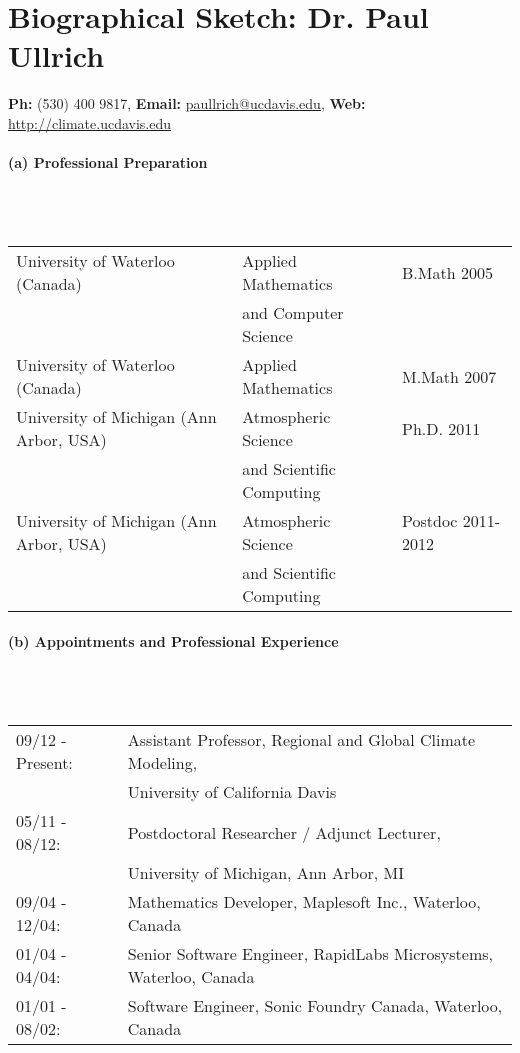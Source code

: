 \documentclass[11pt]{article}
\begin{document}
\thispagestyle{empty}

\appendix

\setcounter{section}{5}

\section*{Biographical Sketch: Dr. Paul Ullrich}

\vspace{-0.5cm}
\begin{center}
\textbf{Ph:} (530) 400 9817, \textbf{Email:} \url{paullrich@ucdavis.edu}, \textbf{Web:} \url{http://climate.ucdavis.edu}
\end{center}

\vspace{-0.8cm}
\paragraph{\large (a) Professional Preparation}\ \\ \ \\
\begin{tabular*}{\textwidth}{@{\extracolsep{\fill}}lll}
University of Waterloo (Canada) & Applied Mathematics & B.Math 2005 \\
& \qquad and Computer Science & \\
University of Waterloo (Canada) & Applied Mathematics & M.Math 2007 \\
University of Michigan (Ann Arbor, USA) & Atmospheric Science & Ph.D. 2011 \\
& \qquad and Scientific Computing & \\
University of Michigan (Ann Arbor, USA) & Atmospheric Science & Postdoc 2011-2012 \\
& \qquad and Scientific Computing & \\
\end{tabular*}

\vspace{-0.5cm}
\paragraph{\large (b) Appointments and Professional Experience}\ \\ \ \\
\begin{tabular*}{\textwidth}{@{\extracolsep{\fill}}ll}
09/12 - Present: & Assistant Professor, Regional and Global Climate Modeling, \\
& \qquad University of California Davis \\
05/11 - 08/12: & Postdoctoral Researcher / Adjunct Lecturer, \\
& \qquad University of Michigan, Ann Arbor, MI \\
09/04 - 12/04: & Mathematics Developer, Maplesoft Inc., Waterloo, Canada \\
01/04 - 04/04: & Senior Software Engineer, RapidLabs Microsystems, Waterloo, Canada \\
01/01 - 08/02: & Software Engineer, Sonic Foundry Canada, Waterloo, Canada
\end{tabular*}
\end{document}
